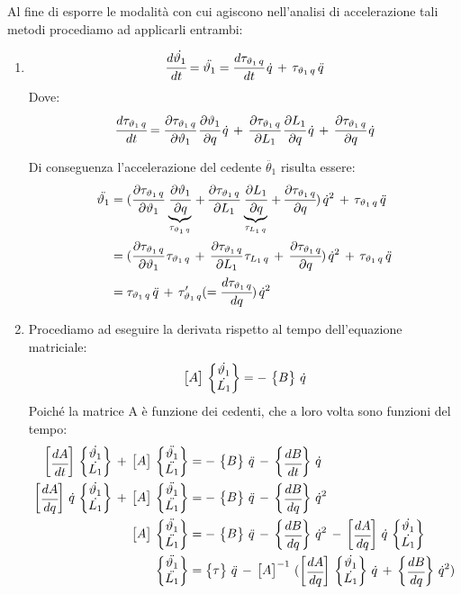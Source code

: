 	Al fine di esporre le modalità con cui agiscono nell'analisi di accelerazione tali metodi procediamo ad applicarli entrambi:
	\begin{enumerate}
	\item 
	\[
	\td{\dot{\theta_1}}{t} = \ddot{\theta_1} = \td{\tau_{\theta_1\,q}}{t}\,\dot{q}\,+\,\tau_{\theta_1\,q}\,\ddot{q}
	\]
	Dove:\hspace{2mm} \[ \td{\tau_{\theta_1\,q}}{t} = \pd{\tau_{\theta_1\,q}}{\theta_1}\,\pd{\theta_1}{q}\,\dot{q}\,+\,\pd{\tau_{\theta_1\,q}}{L_1}\,\pd{L_1}{q}\,\dot{q}\,+\,\pd{\tau_{\theta_1\,q}}{q}\,\dot{q}\]
	
Di conseguenza l'accelerazione del cedente $\ddot{\theta_1}$ risulta essere:
\begin{align*}
	\ddot{\theta_1} &=  (\pd{\tau_{\theta_1\,q}}{\theta_1}\,\underbrace{\pd{\theta_1}{q}}_{\tau_{\theta_1\,q}}\,+\,\pd{\tau_{\theta_1\,q}}{L_1}\,\underbrace{\pd{L_1}{q}}_{\tau_{L_1\,q}}\,+\,\pd{\tau_{\theta_1\,q}}{q})\,\dot{q}^2\, +\, \tau_{\theta_1\,q}\,\ddot{q} \\
	&=  (\pd{\tau_{\theta_1\,q}}{\theta_1}\,\tau_{\theta_1\,q}\,+\,\pd{\tau_{\theta_1\,q}}{L_1}\,\tau_{L_1\,q}\,+\,\pd{\tau_{\theta_1\,q}}{q})\,\dot{q}^2\, +\, \tau_{\theta_1\,q}\,\ddot{q}\\
	&= \tau_{\theta_1\,q}\,\ddot{q}\,+\,\tau'_{\theta_1\,q} (= \td{\tau_{\theta_1\,q}}{q}) \, \dot{q}^2
\end{align*}

\item Procediamo ad eseguire la derivata rispetto al tempo dell'equazione matriciale:
\[
{\M{A}}\,\B{\dot{\theta_1}\\\dot{L_1}} = -\,\B{B}\,\dot{q}
\]
Poiché la matrice A è funzione dei cedenti, che a loro volta sono funzioni del tempo:
\begin{align*}
\M{\td{A}{t}}\,\B{\dot{\theta_1}\\\dot{L_1}}\,+\,\M{A}\,\B{\ddot{\theta_1}\\\ddot{L_1}} &= -\,\B{B}\,\ddot{q}\,-\,\B{\td{B}{t}}\,\dot{q}\\
\M{\td{A}{q}}\,\dot{q}\,\B{\dot{\theta_1}\\\dot{L_1}}\,+\,\M{A}\,\B{\ddot{\theta_1}\\\ddot{L_1}} &= -\,\B{B}\,\ddot{q}\,-\,\B{\td{B}{q}}\,\dot{q}^2\\
\M{A}\,\B{\ddot{\theta_1}\\\ddot{L_1}} &= -\,\B{B}\,\ddot{q}\,-\,\B{\td{B}{q}}\,\dot{q}^2 \,-\,\M{\td{A}{q}}\,\dot{q}\,\B{\dot{\theta_1}\\\dot{L_1}}\\
\B{\ddot{\theta_1}\\\ddot{L_1}} &= \B{\tau}\,\ddot{q}\,-\,\M{A}^{-1}\,(\M{\td{A}{q}}\,\B{\dot{\theta_1}\\\dot{L_1}}\,\dot{q}\,+\,\B{\td{B}{q}}\,\dot{q}^2)
\end{align*}
 

\end{enumerate}
